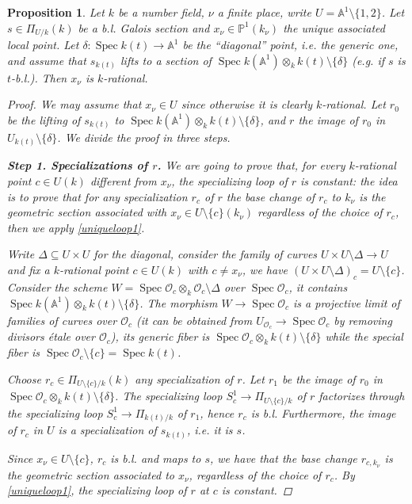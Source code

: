 \documentclass[11pt]{amsart}
\theoremstyle{plain}
\newtheorem{proposition}[theorem]{Proposition}
\theoremstyle{definition}
\newcommand{\on}{\operatorname}
\newcommand{\1}{\mathbb{1}}
\newcommand{\A}{\mathbb{A}}
\newcommand{\mc}{\mathcal}
\newcommand{\s}{\subseteq}
\newcommand{\spec}{\on{Spec}}
\renewcommand{\O}{\mc{O}}
\renewcommand{\P}{\mathbb{P}}
\begin{document}
\begin{proposition}\label{simple}
	Let $k$ be a number field, $\nu$ a finite place, write $U=\A^{1}\setminus\{1,2\}$. Let $s\in\Pi_{U/k}(k)$ be a b.l. Galois section and $x_{\nu}\in\P^{1}(k_{\nu})$ the unique associated local point. Let $\delta:\spec k(t)\to\A^{1}$ be the ``diagonal''	 point, i.e. the generic one, and assume that $s_{k(t)}$ lifts to a section of $\spec k(\A^{1})\otimes_{k} k(t)\setminus\{\delta\}$ (e.g. if $s$ is $t$-b.l.). Then $x_{\nu}$ is $k$-rational.
	\begin{proof}
		We may assume that $x_{\nu}\in U$ since otherwise it is clearly $k$-rational. Let $r_{0}$ be the lifting of $s_{k(t)}$ to $\spec k(\A^{1})\otimes_{k} k(t)\setminus\{\delta\}$, and $r$ the image of $r_{0}$ in $U_{k(t)}\setminus \{\delta\}$. We divide the proof in three steps.
		
		\textbf{Step 1. Specializations of $r$.} We are going to prove that, for every $k$-rational point $c\in U(k)$ different from $x_{\nu}$, the specializing loop of $r$ is constant: the idea is to prove that for any specialization $r_{c}$ of $r$ the base change of $r_{c}$ to $k_{\nu}$ is the geometric section associated with $x_{\nu}\in U\setminus\{c\}(k_{\nu})$ regardless of the choice of $r_{c}$, then we apply \autoref{uniqueloop1}.
		
		Write $\Delta\s U\times U$ for the diagonal, consider the family of curves $U\times U\setminus \Delta\to U$ and fix a $k$-rational point $c\in U(k)$ with $c\neq x_{\nu}$, we have $(U\times U\setminus \Delta)_{c}=U\setminus\{c\}$. Consider the scheme $W=\spec\O_{c}\otimes_{k}\O_{c}\setminus\Delta$ over $\spec \O_{c}$, it contains $\spec k(\A^{1})\otimes_{k} k(t)\setminus\{\delta\}$. The morphism $W\to\spec\O_{c}$ is a projective limit of families of curves over $\O_{c}$ (it can be obtained from $U_{\O_{c}}\to\spec \O_{c}$ by removing divisors étale over $\O_{c}$), its generic fiber is $\spec \O_{c}\otimes_{k} k(t)\setminus\{\delta\}$ while the special fiber is $\spec\O_{c}\setminus\{c\}=\spec k(t)$. 
		
		Choose $r_{c}\in\Pi_{U\setminus\{c\}/k}(k)$ any specialization of $r$. Let $r_{1}$ be the image of $r_{0}$ in $\spec \O_{c}\otimes_{k} k(t)\setminus\{\delta\}$. The specializing loop $S^{1}_{c}\to\Pi_{U\setminus\{c\}/k}$ of $r$ factorizes through the specializing loop $S^{1}_{c}\to\Pi_{k(t)/k}$ of $r_{1}$, hence $r_{c}$ is b.l. Furthermore, the image of $r_{c}$ in $U$ is a specialization of $s_{k(t)}$, i.e. it is $s$.
		
		Since $x_{\nu}\in U\setminus\{c\}$, $r_{c}$ is b.l. and maps to $s$, we have that the base change $r_{c,k_{\nu}}$ is \emph{the} geometric section associated to $x_{\nu}$, regardless of the choice of $r_{c}$. By \autoref{uniqueloop1}, the specializing loop of $r$ at $c$ is constant.
	

\end{proof}
\end{proposition}
\end{document}
